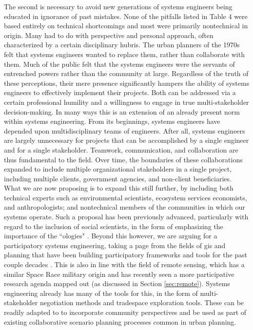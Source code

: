 The second is necessary to avoid new generations of systems engineers being educated in ignorance of past mistakes. None of the pitfalls listed in Table 4 were based entirely on technical shortcomings and most were primarily nontechnical in origin. Many had to do with perspective and personal approach, often characterized by a certain disciplinary hubris. The urban planners of the 1970s felt that systems engineers wanted to replace them, rather than collaborate with them. Much of the public felt that the systems engineers were the servants of entrenched powers rather than the community at large. Regardless of the truth of these perceptions, their mere presence significantly hampers the ability of systems engineers to effectively implement their projects. Both can be addressed via a certain professional humility and a willingness to engage in true multi-stakeholder decision-making. In many ways this is an extension of an already present norm within systems engineering. From its beginnings, systems engineers have depended upon multidisciplinary teams of engineers. After all, systems engineers are largely unnecessary for projects that can be accomplished by a single engineer and for a single stakeholder. Teamwork, communication, and collaboration are thus fundamental to the field. Over time, the boundaries of these collaborations expanded to include multiple organizational stakeholders in a single project, including multiple clients, government agencies, and non-client beneficiaries. What we are now proposing is to expand this still further, by including both technical experts such as environmental scientists, ecosystem services economists, and anthropologists; and nontechnical members of the communities in which our systems operate. Such a proposal has been previously advanced, particularly with regard to the inclusion of social scientists, in the form of emphasizing the importance of the ``ologies" \cite{donaldsonPraiseOlogiesDiscussion2017}. Beyond this however, we are arguing for a participatory systems engineering, taking a page from the fields of \ac{gis} and planning that have been building participatory frameworks and tools for the past couple decades \cite{kimCriticalCartographyParticipatory2015,
pertParticipatoryDevelopmentNew2013,
sieberPublicParticipationGeographic2006,
talenBottomUpGIS2000,
ulibarriCollaborativeModelDevelopment2018}. This is also in line with the field of remote sensing, which has a similar Space Race military origin and has recently seen a more participative research agenda mapped out \cite{bennettPoliticsPixelsReview2022} (as discussed in Section \ref{sec:remote}). Systems engineering already has many of the tools for this, in the form of multi-stakeholder negotiation methods and tradespace exploration tools. These can be readily adapted to to incorporate community perspectives and be used as part of existing collaborative scenario planning processes common in urban planning.


